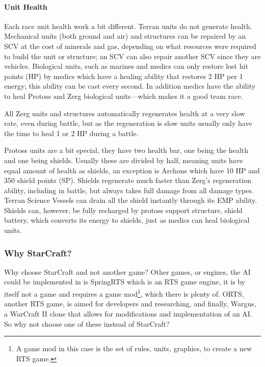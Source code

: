 \paragraph{Unit Health}
Each race unit health work a bit different. Terran units do not generate health. Mechanical units (both ground and air) and structures can be repaired by an SCV at the cost of minerals and gas, depending on what resources were required to build the unit or structure; an SCV can also repair another SCV since they are vehicles. Biological units, such as marines and medics can only restore lost hit points (HP) by medics which have a healing ability that restores 2 HP per 1 energy; this ability can be cast every second. In addition medics have the ability to heal Protoss and Zerg biological units—which makes it a good team race.

All Zerg units and structures automatically regenerates health at a very slow rate, even during battle, but as the regeneration is slow units usually only have the time to heal 1 or 2 HP during a battle.

Protoss units are a bit special, they have two health bar, one being the health and one being shields. Usually these are divided by half, meaning units have equal amount of health as shields, an exception is Archons which have 10 HP and 350 shield points (SP). Shields regenerate much faster than Zerg’s regeneration ability, including in battle, but always takes full damage from all damage types. Terran Science Vessels can drain all the shield instantly through its EMP ability. Shields can, however, be fully recharged by protoss support structure, shield battery, which converts its energy to shields, just as medics can heal biological units.

\subsubsection{Why StarCraft?}
Why choose StarCraft and not another game? Other games, or engines, the AI could be implemented in is SpringRTS\cite{springrts} which is an RTS game engine, it is by itself not a game and requires a game mod\footnote{A game mod in this case is the set of rules, units, graphics, to create a new RTS game.}, which there is plenty of. ORTS\cite{orts}, another RTS game, is aimed for developers and researching, and finally, Wargus\cite{wargus}, a WarCraft II clone that allows for modifications and implementation of an AI. So why not choose one of these instead of StarCraft?

